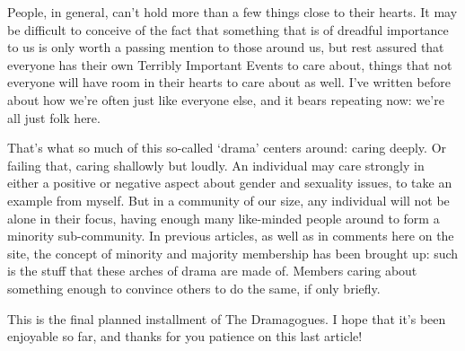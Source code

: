 People, in general, can't hold more than a few things close to their hearts. It may be difficult to conceive of the fact that something that is of dreadful importance to us is only worth a passing mention to those around us, but rest assured that everyone has their own Terribly Important Events to care about, things that not everyone will have room in their hearts to care about as well. I've written before about how we're often just like everyone else, and it bears repeating now: we're all just folk here.

That's what so much of this so-called `drama' centers around: caring deeply. Or failing that, caring shallowly but loudly. An individual may care strongly in either a positive or negative aspect about gender and sexuality issues, to take an example from myself. But in a community of our size, any individual will not be alone in their focus, having enough many like-minded people around to form a minority sub-community. In previous articles, as well as in comments here on the site, the concept of minority and majority membership has been brought up: such is the stuff that these arches of drama are made of. Members caring about something enough to convince others to do the same, if only briefly.

This is the final planned installment of The Dramagogues. I hope that it's been enjoyable so far, and thanks for you patience on this last article!
